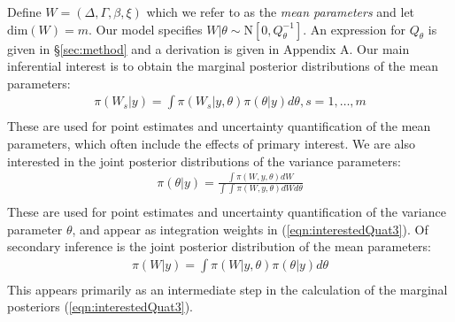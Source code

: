 \documentclass[num-refs,serif,10pt]{wiley-article}
\begin{document}
Define $W = \left(\Delta, \Gamma,\beta, \xi \right)$ which we refer to as the \textit{mean parameters} and let $\text{dim}(W) = m$. Our model specifies $W|\theta\sim\text{N}\left[ 0,Q^{-1}_{\theta}\right]$. An expression for $Q_{\theta}$ is given in \S\ref{sec:method} and a derivation is given in Appendix A. Our main inferential interest is to obtain the marginal posterior distributions of the mean parameters:
\begin{equation}\begin{aligned}\label{eqn:interestedQuat3}
\pi(W_{s}|y) = \int \pi(W_{s}|y,\theta) \pi(\theta|y) d\theta, s = 1,\ldots,m  \\
\end{aligned}\end{equation}
These are used for point estimates and uncertainty quantification of the mean parameters, which often include the effects of primary interest. We are also interested in the joint posterior distributions of the variance parameters:
\begin{equation}\begin{aligned}\label{eqn:interestedQuat1}
\pi(\theta|y) = \frac{\int \pi(W,y,\theta) dW}{\int_{} \int_{} \pi(W,y,\theta) dW d\theta } \\
\end{aligned}\end{equation}
These are used for point estimates and uncertainty quantification of the variance parameter $\theta$, and appear as integration weights in (\ref{eqn:interestedQuat3}). Of secondary inference is the joint posterior distribution of the mean parameters:
\begin{equation}\begin{aligned}\label{eqn:interestedQuat2}
\pi(W|y) = \int \pi(W|y,\theta) \pi(\theta|y) d\theta  \\
\end{aligned}\end{equation}
This appears primarily as an intermediate step in the calculation of the marginal posteriors (\ref{eqn:interestedQuat3}).
\end{document}
